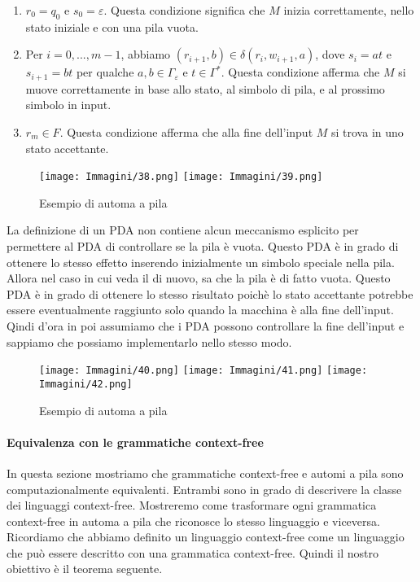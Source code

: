 \documentclass{article}
\begin{document}
\begin{enumerate}
    \item $r_0 = q_0$ e $s_0 = \varepsilon$. Questa condizione significa che $M$ inizia correttamente, nello stato iniziale e con una pila vuota.
    \item Per $i = 0,...,m-1$, abbiamo $(r_{i+1}, b) \in \delta(r_i, w_{i+1}, a)$, dove $s_i = at$ e $s_{i+1} = bt$ per qualche $a, b \in \Gamma_\varepsilon$ e $t \in \Gamma^*$. Questa condizione afferma che $M$ si muove correttamente in base allo stato, al simbolo di pila, e al prossimo simbolo in input.
    \item $r_m \in F$. Questa condizione afferma che alla fine dell'input $M$ si trova in uno stato accettante.
\end{enumerate}

\begin{figure}[H]
    \centering
    \texttt{[image: Immagini/38.png]}
    \texttt{[image: Immagini/39.png]}
    \caption{Esempio di automa a pila}
    \label{fig:pushdown_automaton_example1}
\end{figure}

La definizione di un PDA non contiene alcun meccanismo esplicito per permettere al PDA di controllare se la pila è vuota. Questo PDA è in grado di ottenere lo stesso effetto inserendo inizialmente un simbolo speciale \textdollar \text{ }nella pila. Allora nel caso in cui veda il \textdollar \text{ }di nuovo, sa che la pila è di fatto vuota.
Questo PDA è in grado di ottenere lo stesso risultato poichè lo stato accettante potrebbe essere eventualmente raggiunto solo quando la macchina è alla fine dell'input. Qindi d'ora in poi assumiamo che i PDA possono controllare la fine dell'input e sappiamo che possiamo implementarlo nello stesso modo.

\begin{figure}[H]
    \centering
    \texttt{[image: Immagini/40.png]}
    \texttt{[image: Immagini/41.png]}
    \texttt{[image: Immagini/42.png]}
    \caption{Esempio di automa a pila}
    \label{fig:nuova_immagine}
\end{figure}

\paragraph{Equivalenza con le grammatiche context-free}
\text{ }

In questa sezione mostriamo che grammatiche context-free e automi a pila sono computazionalmente equivalenti. Entrambi sono in grado di descrivere la classe dei linguaggi context-free.
Mostreremo come trasformare ogni grammatica context-free in automa a pila che riconosce lo stesso linguaggio e viceversa.
Ricordiamo che abbiamo definito un linguaggio context-free come un linguaggio che può essere descritto con una grammatica context-free.
Quindi il nostro obiettivo è il teorema seguente.
\end{document}
